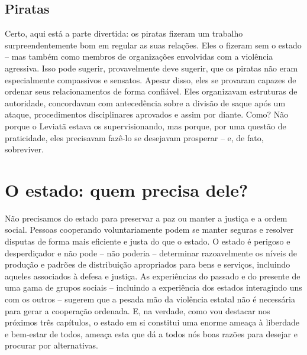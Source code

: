 \subsection*{Piratas}

Certo, aqui está a parte divertida: os piratas fizeram um trabalho surpreendentemente bom em regular as suas relações. Eles o fizeram sem o estado -- mas também como membros de organizações envolvidas com a violência agressiva. Isso pode sugerir, provavelmente deve sugerir, que os piratas não eram especialmente compassivos e sensatos. Apesar disso, eles se provaram capazes de ordenar seus relacionamentos de forma confiável. Eles organizavam estruturas de autoridade, concordavam com antecedência sobre a divisão de saque após um ataque, procedimentos disciplinares aprovados e assim por diante. Como? Não porque o Leviatã estava os supervisionando, mas porque, por uma questão de praticidade, eles precisavam fazê-lo se desejavam prosperar -- e, de fato, sobreviver.

\section{O estado: quem precisa dele?}

Não precisamos do estado para preservar a paz ou manter a justiça e a ordem social. Pessoas cooperando voluntariamente podem se manter seguras e resolver disputas de forma mais eficiente e justa do que o estado. O estado é perigoso e desperdiçador e não pode -- não poderia -- determinar razoavelmente os níveis de produção e padrões de distribuição apropriados para bens e serviços, incluindo aqueles associados à defesa e justiça. As experiências do passado e do presente de uma gama de grupos sociais -- incluindo a experiência dos estados interagindo uns com os outros -- sugerem que a pesada mão da violência estatal não é necessária para gerar a cooperação ordenada. E, na verdade, como vou destacar nos próximos três capítulos, o estado em si constitui uma enorme ameaça à liberdade e bem-estar de todos, ameaça esta que dá a todos nós boas razões para desejar e procurar por alternativas.